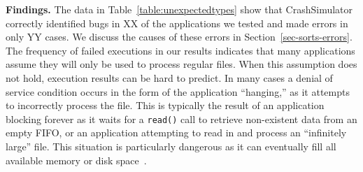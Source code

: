 {\bf Findings.}
The data in Table~\ref{table:unexpectedtypes} show that CrashSimulator
correctly identified bugs in XX of the applications we tested
and made errors in only YY cases.  We discuss the causes of these errors
in Section~\ref{sec-sorts-errors}.
The frequency of failed executions in our results
indicates that many
applications assume they will only be used to process
regular files.  When this assumption does not hold, execution results
can be hard to predict.
In many cases a denial of
service condition occurs in the form of the application ``hanging,'' as it
attempts to incorrectly process the file.
This is typically the result of
an application blocking forever as it waits for a {\tt read()}
call to retrieve non-existent data from an empty FIFO,
or an application attempting
to read in and process an
``infinitely large'' file.
This situation is particularly dangerous as
it can eventually
fill all available memory or disk space~\cite{Cappos_CCS_08}.


